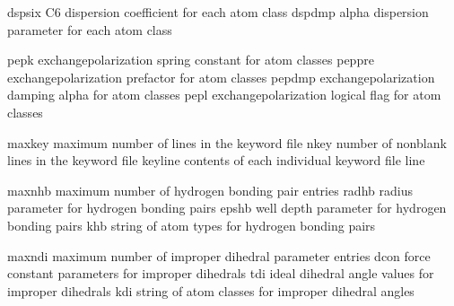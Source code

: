\documentclass[letterpaper,11pt,english]{sphinxmanual}
\begin{document}
\sphinxAtStartPar
{}

\begin{sphinxVerbatim}[commandchars=\\\{\}]
dspsix          C6 dispersion coefficient for each atom class
dspdmp          alpha dispersion parameter for each atom class
\end{sphinxVerbatim}

\sphinxAtStartPar
{}

\begin{sphinxVerbatim}[commandchars=\\\{\}]
pepk            exchange\PYGZhy{}polarization spring constant for atom classes
peppre          exchange\PYGZhy{}polarization prefactor for atom classes
pepdmp          exchange\PYGZhy{}polarization damping alpha for atom classes
pepl            exchange\PYGZhy{}polarization logical flag for atom classes
\end{sphinxVerbatim}

\sphinxAtStartPar
{}

\begin{sphinxVerbatim}[commandchars=\\\{\}]
maxkey          maximum number of lines in the keyword file
nkey            number of nonblank lines in the keyword file
keyline         contents of each individual keyword file line
\end{sphinxVerbatim}

\sphinxAtStartPar
{}

\begin{sphinxVerbatim}[commandchars=\\\{\}]
maxnhb          maximum number of hydrogen bonding pair entries
radhb           radius parameter for hydrogen bonding pairs
epshb           well depth parameter for hydrogen bonding pairs
khb             string of atom types for hydrogen bonding pairs
\end{sphinxVerbatim}

\sphinxAtStartPar
{}

\begin{sphinxVerbatim}[commandchars=\\\{\}]
maxndi          maximum number of improper dihedral parameter entries
dcon            force constant parameters for improper dihedrals
tdi             ideal dihedral angle values for improper dihedrals
kdi             string of atom classes for improper dihedral angles
\end{sphinxVerbatim}
\end{document}

